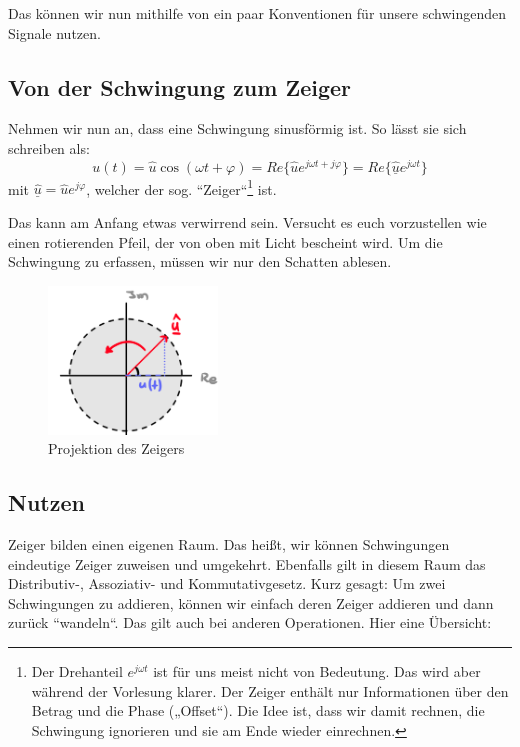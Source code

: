 \documentclass[11pt,a4paper]{article}
\begin{document}
\noindent Das können wir nun mithilfe von ein paar Konventionen für unsere schwingenden Signale nutzen.

\subsection{Von der Schwingung zum Zeiger}

Nehmen wir nun an, dass eine Schwingung sinusförmig ist. So lässt sie sich schreiben als:
\[
u(t) = \hat{u}\cos(\omega t + \varphi) = Re\{\hat{u}e^{j\omega t + j\varphi}\} = Re\{\hat{\underline{u}} e^{j\omega t}\}
\]
mit \( \hat{\underline{u}} = \hat{u} e^{j\varphi} \), welcher der sog. ``Zeiger``\footnote{Der Drehanteil \( e^{j\omega t} \) ist für uns meist nicht von Bedeutung. Das wird aber während der Vorlesung klarer. Der Zeiger enthält nur Informationen über den Betrag und die Phase („Offset“). Die Idee ist, dass wir damit rechnen, die Schwingung ignorieren und sie am Ende wieder einrechnen.}
 ist.
\vspace{0.3cm}

Das kann am Anfang etwas verwirrend sein. Versucht es euch vorzustellen wie einen rotierenden Pfeil, der von oben mit Licht bescheint wird. Um die Schwingung zu erfassen, müssen wir nur den Schatten ablesen.

\centering 
\begin{figure}[H]
  \centering
  \includegraphics[width=0.4\textwidth]{pointer.png}
  \caption{Projektion des Zeigers}
  \label{fig:pointer}
\end{figure}
\centering

\raggedright



\subsection{Nutzen}
Zeiger bilden einen eigenen Raum. Das heißt, wir können Schwingungen eindeutige Zeiger zuweisen und umgekehrt. Ebenfalls gilt in diesem Raum das Distributiv-, Assoziativ- und Kommutativgesetz. Kurz gesagt: Um zwei Schwingungen zu addieren, können wir einfach deren Zeiger addieren und dann zurück ``wandeln``. Das gilt auch bei anderen Operationen. Hier eine Übersicht:
\end{document}
